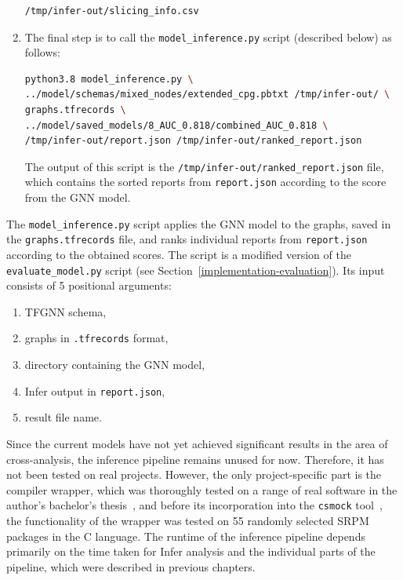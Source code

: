 \begin{enumerate}
\begin{lstlisting}[language=bash, xleftmargin=2em]
/tmp/infer-out/slicing_info.csv
\end{lstlisting}
    \item The final step is to call the \texttt{model\_inference.py} script (described below) as follows:
\begin{lstlisting}[language=bash, xleftmargin=2em]
python3.8 model_inference.py \
../model/schemas/mixed_nodes/extended_cpg.pbtxt /tmp/infer-out/ \
graphs.tfrecords \
../model/saved_models/8_AUC_0.818/combined_AUC_0.818 \
/tmp/infer-out/report.json /tmp/infer-out/ranked_report.json
\end{lstlisting}
    The output of this script is the \texttt{/tmp/infer-out/ranked\_report.json} file, which contains the sorted reports from \texttt{report.json} according to the score from the GNN model.
\end{enumerate}

The \texttt{model\_inference.py} script applies the GNN model to the graphs, saved in the \texttt{graphs.tfrecords} file, and ranks individual reports from \texttt{report.json} according to the obtained scores. The script is a modified version of the \texttt{evaluate\_model.py} script (see Section~\ref{implementation-evaluation}). Its input consists of 5 positional arguments:
\begin{enumerate}
    \item TFGNN schema,
    \item graphs in \texttt{.tfrecords} format,
    \item directory containing the GNN model,
    \item Infer output in \texttt{report.json},
    \item result file name.
\end{enumerate}

Since the current models have not yet achieved significant results in the area of cross-analysis, the inference pipeline remains unused for now. Therefore, it has not been tested on real projects. However, the only project-specific part is the compiler wrapper, which was thoroughly tested on a range of real software in the author's bachelor's thesis~\cite{bc}, and before its incorporation into the \texttt{csmock} tool~\cite{CsmockAVM, CsmockFLOCK}, the functionality of the wrapper was tested on 55 randomly selected SRPM packages in the C language. The runtime of the inference pipeline depends primarily on the time taken for Infer analysis and the individual parts of the pipeline, which were described in previous chapters.


